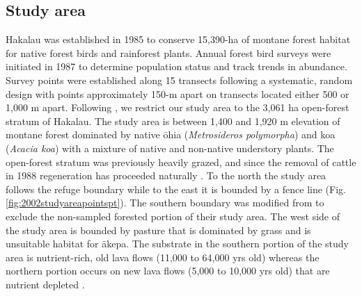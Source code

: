 \documentclass[preprint,12pt]{elsarticle}
\newcommand{\akepa}{\textquotesingle\={a}kepa}  %
\begin{document}
\subsection*{Study area}
Hakalau was established in 1985 to conserve 15,390-ha of montane forest habitat for native forest birds and rainforest plants. Annual forest bird surveys were initiated in 1987 to determine population status and track trends in abundance. Survey points were established along 15 transects following a systematic, random design with points approximately 150-m apart on transects located either 500 or 1,000 m apart. Following \cite{camp_population_2010, camp_statespace_2016}, we restrict our study area to the 3,061 ha open-forest stratum of Hakalau. The study area is between 1,400 and 1,920 m elevation of montane forest dominated by native \textquotesingle \={o}hi\textquotesingle a (\textit{Metrosideros polymorpha}) and koa (\textit{Acacia koa}) with a mixture of native and non-native understory plants. The open-forest stratum was previously heavily grazed, and since the removal of cattle in 1988 regeneration has proceeded naturally \citep{maxfield_hakalau_1998}. To the north the study area follows the refuge boundary while to the east it is bounded by a fence line (Fig. \ref{fig:2002studyareapointspt}). The southern boundary was modified from \cite{camp_population_2010} to exclude the non-sampled forested portion of their study area. The west side of the study area is bounded by pasture that is dominated by grass and is unsuitable habitat for \akepa. The substrate in the southern portion of the study area is nutrient-rich, old lava flows (11,000 to 64,000 yrs old) whereas the northern portion occurs on new lava flows (5,000 to 10,000 yrs old) that are nutrient depleted \citep{ccp_hakalau_2010}.
\end{document}
